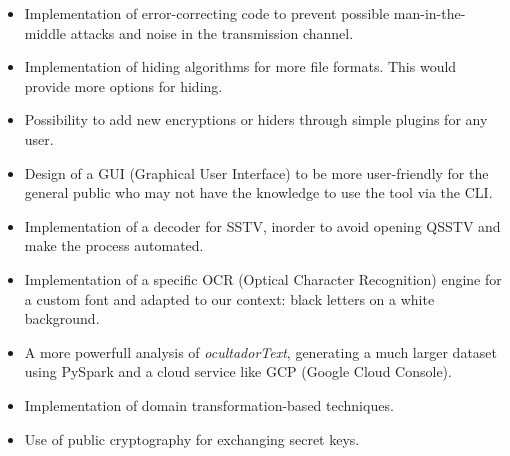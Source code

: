 \begin{itemize}
    \item Implementation of error-correcting code to prevent possible man-in-the-middle attacks and noise in the transmission channel.
    
    \item Implementation of hiding algorithms for more file formats. This would provide more options for hiding.
    
    \item Possibility to add new encryptions or hiders through simple plugins for any user.
    
    \item Design of a GUI (Graphical User Interface) to be more user-friendly for the general public who may not have the knowledge to use the tool via the CLI.
    
    \item Implementation of a decoder for SSTV, inorder to avoid opening QSSTV and make the process automated.
    
    \item Implementation of a specific OCR (Optical Character Recognition) engine for a custom font and adapted to our context: black letters on a white background.
    
    \item A more powerfull analysis of \textit{ocultadorText}, generating a much larger dataset using PySpark and a cloud service like GCP (Google Cloud Console).
    
    \item Implementation of domain transformation-based techniques.
    
    \item Use of public cryptography for exchanging secret keys.

\end{itemize}


